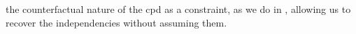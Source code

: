 \documentclass{article}
\theoremstyle{plain}
\theoremstyle{definition}
\theoremstyle{remark}
\numberwithin{equation}{section}
\begin{document}
        the counterfactual nature of the cpd as a constraint, as we
        do in , allowing us to recover the
                independencies without assuming them. 

	
\end{document}

